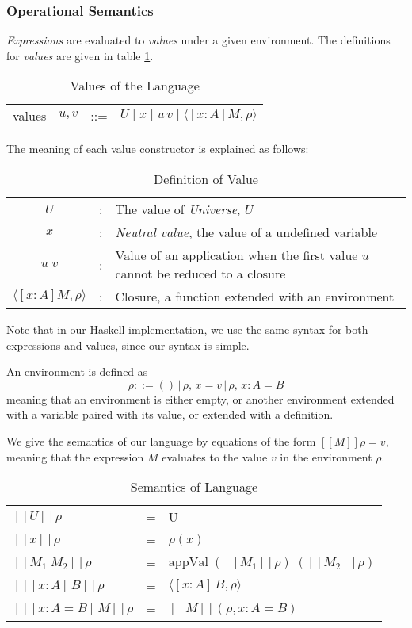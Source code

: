 \documentclass{article}
\theoremstyle{remark}
\begin{document}
\subsubsection{Operational Semantics}
\emph{Expressions} are evaluated to \emph{values} under a given environment. The definitions for \emph{values} are given in table \ref{tab:values}.

\begin{table}[h]
  \centering
  \begin{tabular}{l l l l}
    values & $u, v$ & ::= & $U \mid x \mid u\, v \mid \langle [x : A] M, \rho \rangle $
  \end{tabular}
  \caption{Values of the Language}
  \label{tab:values}
\end{table}

The meaning of each value constructor is explained as follows:
\begin{table}[h]
  \centering
  \begin{tabular}{c l p{8cm}}
    $U$ & : & The value of \emph{Universe}, $U$ \\
    $x$ & : & \emph{Neutral value}, the value of a undefined variable \\
    $u \; v$ & : & Value of an application when the first value $u$ cannot be reduced to a closure \\
    $\langle [x : A] M, \rho \rangle$ & : & Closure, a function extended with an environment\\ 
  \end{tabular}
  \caption{Definition of Value}
\end{table}

Note that in our Haskell implementation, we use the same syntax for both expressions and values, since our syntax is simple.

An environment is defined as
\[
\rho ::= ()\,|\,\rho,\,x = v\,|\,\rho,\,x : A = B
\]
meaning that an environment is either empty, or another environment extended with a variable paired with its value, or extended with a definition. 

We give the semantics of our language by equations of the form $[\![M]\!]\rho = v$, meaning that the expression $M$ evaluates to the value $v$ in the environment $\rho$.
\begin{table}[h]
  \centering
  \begin{tabular}{l l l}
    $[\![U]\!]\rho$ & = & U \\
    $[\![x]\!]\rho$ & = & $\rho(x)$ \\
    $[\![M_1 \; M_2]\!]\rho$ & = & $\text{appVal} \; ([\![M_1]\!]\rho) \; ([\![M_2]\!]\rho)$ \\
    $[\![[x : A]\,B]\!]\rho$ & = & $\langle[x : A]\,B, \rho\rangle$ \\
    $[\![[x : A = B]\,M]\!]\rho$ & = & $[\![M]\!](\rho, x : A = B)$ 
  \end{tabular}
  \caption{Semantics of Language}
\end{table}
\end{document}
